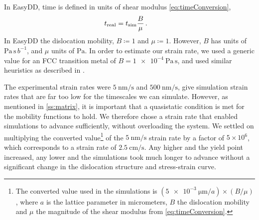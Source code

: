 In EasyDD, time is defined in units of shear modulus \cref{eq:timeConversion},
\begin{align}\label{eq:timeConversion}
    t_{\textrm{real}} & = t_{\textrm{sim}} \dfrac{B}{\mu}\,.
\end{align}
In EasyDD the dislocation mobility, $B \coloneqq 1$ and $\mu \coloneqq 1$. However, $B$ has units of $\si{\pascal\,\second\,b^{-1}}$, and $\mu$ units of $\si{\pascal}$. In order to estimate our strain rate, we used a generic value for an FCC transition metal of $B = \SI{1e-4}{\pascal\,\second}$, and used similar heuristics as described in \cite[p.~237]{ddlab}.

The experimental strain rates were $\SI{5}{\nano\metre\per\second}$ and $\SI{500}{\nano\metre\per\second}$, give simulation strain rates that are far too low for the timescales we can simulate. However, as mentioned in \cref{ss:matrix}, it is important that a quasistatic condition is met for the mobility functions to hold. We therefore chose a strain rate that enabled simulations to advance sufficiently, without overloading the system. We settled on multiplying the converted value\footnote{The converted value used in the simulations is $\left(\SI{5e-3}{\micro\metre}/a\right) \times \left(B /  \mu \right)$, where $a$ is the lattice parameter in micrometers, $B$ the dislocation mobility and $ \mu $ the magnitude of the shear modulus from \cref{eq:timeConversion}.} of the $\SI{5}{\nano\metre\per\second}$ strain rate by a factor of $5 \times 10^6$, which corresponds to a strain rate of $\SI{2.5}{\centi\metre\per\second}$. Any higher and the yield point increased, any lower and the simulations took much longer to advance without a significant change in the dislocation structure and stress-strain curve.

